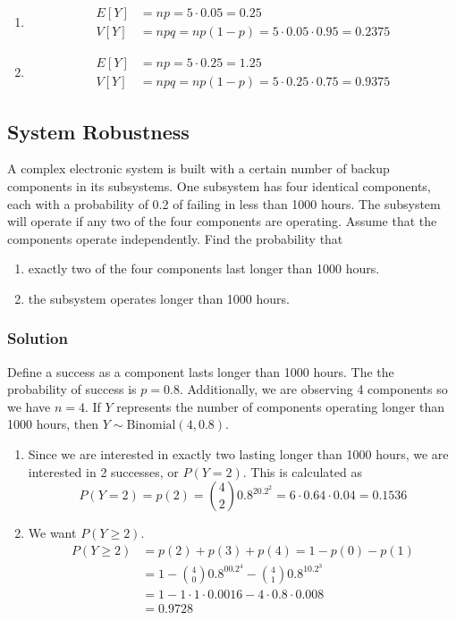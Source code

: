 \documentclass[11pt]{article}
\theoremstyle{definition}
\begin{document}
\begin{enumerate}[label=\alph*)]
	\item
		$$
			\begin{aligned}
				E[Y] & = np = 5 \cdot 0.05 = 0.25 \\
				V[Y] & = npq = np(1-p) = 5 \cdot 0.05 \cdot 0.95 = 0.2375
			\end{aligned}
		$$
	\item
		$$
			\begin{aligned}
				E[Y] & = np = 5 \cdot 0.25 = 1.25 \\
				V[Y] & = npq = np(1-p) = 5 \cdot 0.25 \cdot 0.75 = 0.9375
			\end{aligned}
		$$
\end{enumerate}

\subsection{System Robustness}

A complex electronic system is built with a certain number of backup components in its subsystems. One subsystem has four identical components, each with a probability of 0.2 of failing in less than 1000 hours. The subsystem will operate if any two of the four components are operating. Assume that the components operate independently. Find the probability that

\begin{enumerate}[label=\alph*)]
	\item exactly two of the four components last longer than 1000 hours.
	\item the subsystem operates longer than 1000 hours.
\end{enumerate}

\subsubsection*{Solution}

Define a success as a component lasts longer than 1000 hours. The the probability of success is $p=0.8$. Additionally, we are observing 4 components so we have $n=4$. If $Y$ represents the number of components operating longer than 1000 hours, then $Y \sim \text{Binomial}(4, 0.8)$.

\begin{enumerate}[label=\alph*)]
	\item Since we are interested in exactly two lasting longer than 1000 hours, we are interested in 2 successes, or $P(Y=2)$. This is calculated as
	$$
		P(Y=2) = p(2) = {4 \choose 2} 0.8^20.2^2 = 6 \cdot 0.64 \cdot 0.04 = 0.1536
	$$
	\item We want $P(Y \geq 2)$.
	$$
		\begin{aligned}
			P(Y \geq 2) & = p(2) + p(3) + p(4) = 1 - p(0) - p(1) \\
			& = 1 - {4 \choose 0}0.8^00.2^4 - {4 \choose 1}0.8^10.2^3 \\
			& = 1 - 1 \cdot 1 \cdot 0.0016 - 4 \cdot 0.8 \cdot 0.008 \\
			& = 0.9728
		\end{aligned}
	$$
\end{enumerate}
\end{document}
